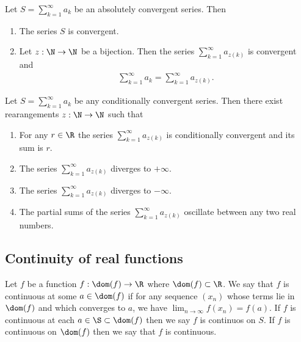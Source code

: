 \documentclass{article}
\begin{document}
\begin{theorem}[Notes 1.8]
    Let $S=\sum_{k=1}^\infty a_k$ be an absolutely convergent series. Then
    \begin{enumerate}
        \item The series $S$ is convergent.
        \item Let $z:\N\to\N$ be a bijection. Then the series $\sum_{k=1}^\infty a_{z(k)}$
              is convergent and \begin{align*}
                  \sum_{k=1}^\infty a_k = \sum_{k=1}^\infty a_{z(k)}.
              \end{align*}
    \end{enumerate}
\end{theorem}

\begin{theorem}[Notes 1.9]
    Let $S=\sum_{k=1}^\infty a_k$ be any conditionally convergent series. Then there
    exist rearangements $z:\N\to\N$ such that
    \begin{enumerate}
        \item For any $r\in\R$ the series $\sum_{k=1}^\infty a_{z(k)}$ is conditionally
              convergent and its sum is $r$.
        \item The series $\sum_{k=1}^\infty a_{z(k)}$ diverges to $+\infty$.
        \item The series $\sum_{k=1}^\infty a_{z(k)}$ diverges to $-\infty$.
        \item The partial sums of the series $\sum_{k=1}^\infty a_{z(k)}$ oscillate between any two real numbers.
    \end{enumerate}
\end{theorem}

\subsection{Continuity of real functions}

\begin{definition}[Notes 1.7]
    Let $f$ be a function $f:\dom(f)\to\R$ where $\dom(f)\subset\R$. We say that $f$ is
    continuous at some $a\in\dom(f)$ if for any sequence $(x_n)$ whose terms lie in
    $\dom(f)$ and which converges to $a$, we have $\lim_{n\to\infty}f(x_n)=f(a)$. If
    $f$ is continuous at each $a\in\S\subset\dom(f)$ then we say $f$ is continuos on $S$.
    If $f$ is continuous on $\dom(f)$ then we say that $f$ is continuous.
\end{definition}
\end{document}
